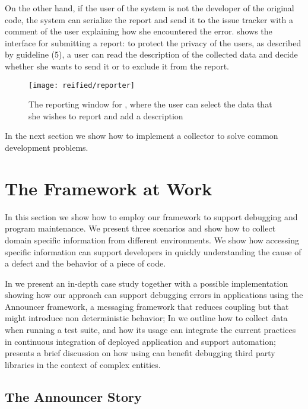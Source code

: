 On the other hand, if the user of the system is not the developer of the original code, the system can serialize the report and send it to the issue tracker with a comment of the user explaining how she encountered the error.
 shows the interface for submitting a report: to protect the privacy of the users, as described by guideline (5), a user can read the description of the collected data and decide whether she wants to send it or to exclude it from the report.

\begin{figure}[ht]
  \centering
  \texttt{[image: reified/reporter]}
  \caption{The reporting window for \sln, where the user can select the data that she wishes to report and add a description}
  \label{fig:reporter}
\end{figure}

In the next section we show how to implement a collector to solve common development problems.


\section{The Framework at Work}\label{sec:stories}

In this section we show how to employ our framework to support debugging and program maintenance. We present three scenarios and show how to collect domain specific information from different environments. We show how accessing specific information can support developers in quickly understanding the cause of a defect and the behavior of a piece of code.

In  we present an in-depth case study together with a possible implementation showing how our approach can support debugging errors in applications using the Announcer framework, a messaging framework that reduces coupling but that might introduce non deterministic behavior; In  we outline how to collect data when running a test suite, and how its usage can integrate the current practices in continuous integration of deployed application and support automation;  presents a brief discussion on how using \sln can benefit debugging third party libraries in the context of complex entities.

\subsection{The Announcer Story}\label{sec:story-announcer}

